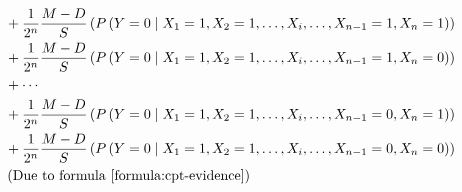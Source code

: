 \documentclass{article}
\numberwithin{equation}{section}
\numberwithin{figure}{section}
\numberwithin{table}{section}
\begin{document}
\begin{align*}
&+\frac{1}{2^n}\frac{M-D}{S}\left(P\left(Y=0\mathrel{\left|\vphantom{Y=0 X_1=1,X_2=1,\dots ,X_i,\dots ,X_{n-1}=1,X_n=1}\right.\kern-\nulldelimiterspace}X_1=1,X_2=1,\dots ,X_i,\dots ,X_{n-1}=1,X_n=1\right)\right)\\
&+\frac{1}{2^n}\frac{M-D}{S}\left(P\left(Y=0\mathrel{\left|\vphantom{Y=0 X_1=1,X_2=1,\dots ,X_i,\dots ,X_{n-1}=1,X_n=0}\right.\kern-\nulldelimiterspace}X_1=1,X_2=1,\dots ,X_i,\dots ,X_{n-1}=1,X_n=0\right)\right)\\
&+\cdots \\
&+\frac{1}{2^n}\frac{M-D}{S}\left(P\left(Y=0\mathrel{\left|\vphantom{Y=0 X_1=1,X_2=1,\dots ,X_i,\dots ,X_{n-1}=0,X_n=1}\right.\kern-\nulldelimiterspace}X_1=1,X_2=1,\dots ,X_i,\dots ,X_{n-1}=0,X_n=1\right)\right)\\
&+\frac{1}{2^n}\frac{M-D}{S}\left(P\left(Y=0\mathrel{\left|\vphantom{Y=0 X_1=1,X_2=1,\dots ,X_i,\dots ,X_{n-1}=0,X_n=0}\right.\kern-\nulldelimiterspace}X_1=1,X_2=1,\dots ,X_i,\dots ,X_{n-1}=0,X_n=0\right)\right)\\
&\left(\mathrm{Due\ to\ formula\ \ref{formula:cpt-evidence}}\right)
\end{align*}
\end{document}
